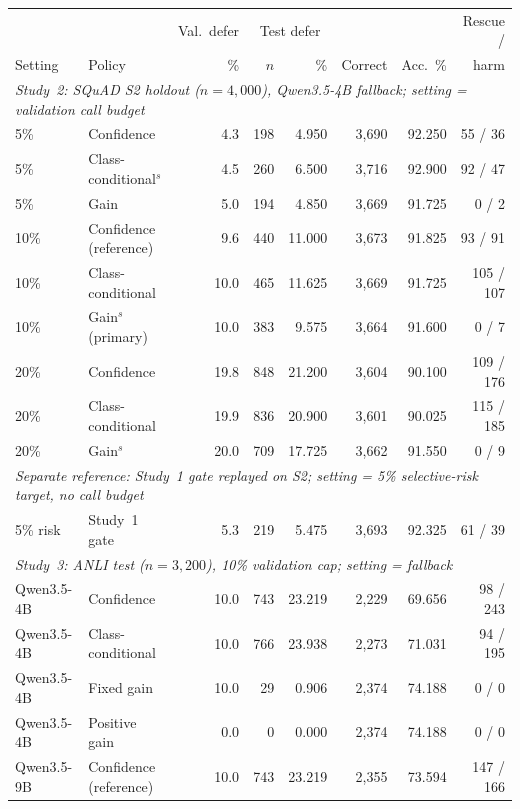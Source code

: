 \documentclass[11pt]{article}
\begin{document}
\begin{table}[t]
\centering
\small
\setlength{\tabcolsep}{4.5pt}
\begin{tabular}{llrrrrrr}
\toprule
 & & Val.\ defer & \multicolumn{2}{c}{Test defer} & & & Rescue / \\
\cmidrule(lr){4-5}
Setting & Policy & \% & $n$ & \% & Correct & Acc.\ \% & harm \\
\midrule
\multicolumn{8}{l}{\emph{Study~2: SQuAD S2 holdout ($n{=}4{,}000$), Qwen3.5-4B fallback; setting = validation call budget}} \\
5\% & Confidence & 4.3 & 198 & 4.950 & 3,690 & 92.250 & 55 / 36 \\
5\% & Class-conditional$^{s}$ & 4.5 & 260 & 6.500 & 3,716 & 92.900 & 92 / 47 \\
5\% & Gain & 5.0 & 194 & 4.850 & 3,669 & 91.725 & 0 / 2 \\
10\% & Confidence (reference) & 9.6 & 440 & 11.000 & 3,673 & 91.825 & 93 / 91 \\
10\% & Class-conditional & 10.0 & 465 & 11.625 & 3,669 & 91.725 & 105 / 107 \\
10\% & Gain$^{s}$ (primary) & 10.0 & 383 & 9.575 & 3,664 & 91.600 & 0 / 7 \\
20\% & Confidence & 19.8 & 848 & 21.200 & 3,604 & 90.100 & 109 / 176 \\
20\% & Class-conditional & 19.9 & 836 & 20.900 & 3,601 & 90.025 & 115 / 185 \\
20\% & Gain$^{s}$ & 20.0 & 709 & 17.725 & 3,662 & 91.550 & 0 / 9 \\
\midrule
\multicolumn{8}{l}{\emph{Separate reference: Study~1 gate replayed on S2; setting = 5\% selective-risk target, no call budget}} \\
5\% risk & Study~1 gate & 5.3 & 219 & 5.475 & 3,693 & 92.325 & 61 / 39 \\
\midrule
\multicolumn{8}{l}{\emph{Study~3: ANLI test ($n{=}3{,}200$), 10\% validation cap; setting = fallback}} \\
Qwen3.5-4B & Confidence & 10.0 & 743 & 23.219 & 2,229 & 69.656 & 98 / 243 \\
Qwen3.5-4B & Class-conditional & 10.0 & 766 & 23.938 & 2,273 & 71.031 & 94 / 195 \\
Qwen3.5-4B & Fixed gain & 10.0 & 29 & 0.906 & 2,374 & 74.188 & 0 / 0 \\
Qwen3.5-4B & Positive gain & 0.0 & 0 & 0.000 & 2,374 & 74.188 & 0 / 0 \\
Qwen3.5-9B & Confidence (reference) & 10.0 & 743 & 23.219 & 2,355 & 73.594 & 147 / 166 \\

\end{tabular}
\end{table}
\end{document}
